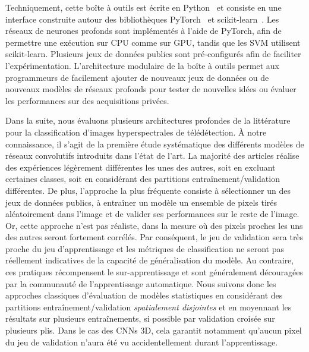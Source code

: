
Techniquement, cette boîte à outils est écrite en Python~\cite{python_software_foundation_python_nodate} et consiste en une interface construite autour des bibliothèques \gls{PyTorch}~\cite{noauthor_pytorch_2016} et \gls{scikit-learn}~\cite{pedregosa_scikit-learn_2011}. Les réseaux de neurones profonds sont implémentés à l'aide de \gls{PyTorch}, afin de permettre une exécution sur \gls{CPU} comme sur \gls{GPU}, tandis que les \gls{SVM} utilisent \gls{scikit-learn}. Plusieurs jeux de données publics sont pré-configurés afin de faciliter l'expérimentation. L'architecture modulaire de la boîte à outils permet aux programmeurs de facilement ajouter de nouveaux jeux de données ou de nouveaux modèles de réseaux profonds pour tester de nouvelles idées ou évaluer les performances sur des acquisitions privées.

Dans la suite, nous évaluons plusieurs architectures profondes de la littérature pour la classification d'images hyperspectrales de télédétection. À notre connaissance, il s'agit de la première étude systématique des différents modèles de réseaux convolutifs introduits dans l'état de l'art. La majorité des articles réalise des expériences légèrement différentes les unes des autres, soit en excluant certaines classes, soit en considérant des partitions entraînement/validation différentes. De plus, l'approche la plus fréquente consiste à sélectionner un des jeux de données publics, à entraîner un modèle un ensemble de pixels tirés aléatoirement dans l'image et de valider ses performances sur le reste de l'image. Or, cette approche n'est pas réaliste, dans la mesure où des pixels proches les uns des autres seront fortement corrélés. Par conséquent, le jeu de validation sera très proche du jeu d'apprentissage et les métriques de classification ne seront pas réellement indicatives de la capacité de généralisation du modèle. Au contraire, ces pratiques récompensent le sur-apprentissage et sont généralement découragées par la communauté de l'apprentissage automatique. Nous suivons donc les approches classiques d'évaluation de modèles statistiques en considérant des partitions entraînement/validation \emph{spatialement disjointes} et en moyennant les résultats sur plusieurs entraînements, si possible par validation croisée sur plusieurs plis. Dans le cas des \glspl{CNN} 3D, cela garantit notamment qu'aucun pixel du jeu de validation n'aura été vu accidentellement durant l'apprentissage.

